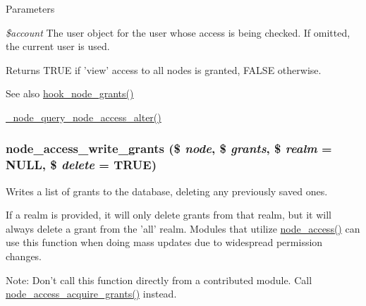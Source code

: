 \begin{DoxyParams}{Parameters}
\item[{\em \$account}]The user object for the user whose access is being checked. If omitted, the current user is used.\end{DoxyParams}
\begin{DoxyReturn}{Returns}
TRUE if 'view' access to all nodes is granted, FALSE otherwise.
\end{DoxyReturn}
\begin{DoxySeeAlso}{See also}
\hyperlink{group__node__access_gaa973f2ab6ab14c3fa14e5138c6d69ecf}{hook\_\-node\_\-grants()} 

\hyperlink{group__node__access_ga5f4838d9b5cac9f3bee9a26f39e80691}{\_\-node\_\-query\_\-node\_\-access\_\-alter()} 
\end{DoxySeeAlso}
\hypertarget{group__node__access_ga735fbb5dfa05cc1aed121655a1694909}{
\subsubsection[{node\_\-access\_\-write\_\-grants}]{\setlength{\rightskip}{0pt plus 5cm}node\_\-access\_\-write\_\-grants (\$ {\em node}, \/  \$ {\em grants}, \/  \$ {\em realm} = {\ttfamily NULL}, \/  \$ {\em delete} = {\ttfamily TRUE})}}
\label{group__node__access_ga735fbb5dfa05cc1aed121655a1694909}
Writes a list of grants to the database, deleting any previously saved ones.

If a realm is provided, it will only delete grants from that realm, but it will always delete a grant from the 'all' realm. Modules that utilize \hyperlink{group__node__access_ga46f0f1ed812befada8f8e7d1b8c352db}{node\_\-access()} can use this function when doing mass updates due to widespread permission changes.

Note: Don't call this function directly from a contributed module. Call \hyperlink{group__node__access_ga6fbbc13a4098f72663c0a67f81100f67}{node\_\-access\_\-acquire\_\-grants()} instead.


